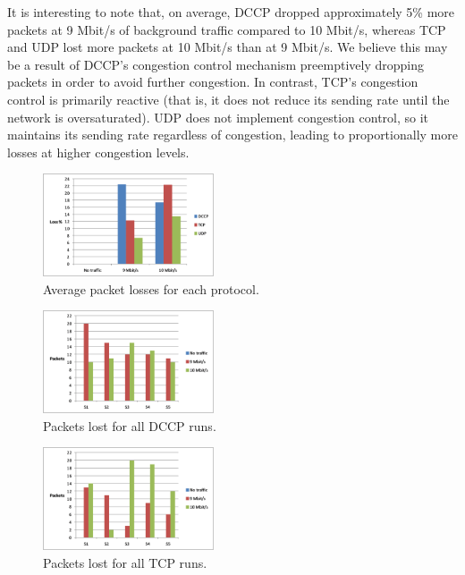It is interesting to note that, on average, DCCP dropped approximately 5\% more
packets at 9 Mbit/s of background traffic compared to 10 Mbit/s, whereas TCP and
UDP lost more packets at 10 Mbit/s than at 9 Mbit/s. We believe this may be a
result of DCCP's congestion control mechanism preemptively dropping packets in
order to avoid further congestion.  In contrast, TCP's congestion control is
primarily reactive (that is, it does not reduce its sending rate until the
network is oversaturated). UDP does not implement congestion control, so it
maintains its sending rate regardless of congestion, leading to proportionally
more losses at higher congestion levels.

\begin{figure}[!h]
   \centering
      \includegraphics[width=0.45\textwidth]{pics/avg_losses}
   \caption{Average packet losses for each protocol.}
\label{fig:avg_losses}
\end{figure}

\begin{figure}[!h]
   \centering
      \includegraphics[width=0.45\textwidth]{pics/dccp_losses}
   \caption{Packets lost for all DCCP runs.}
\label{fig:dccp_losses}
\end{figure}

\begin{figure}[!h]
   \centering
      \includegraphics[width=0.45\textwidth]{pics/tcp_losses}
   \caption{Packets lost for all TCP runs.}
\label{fig:tcp_losses}
\end{figure}

